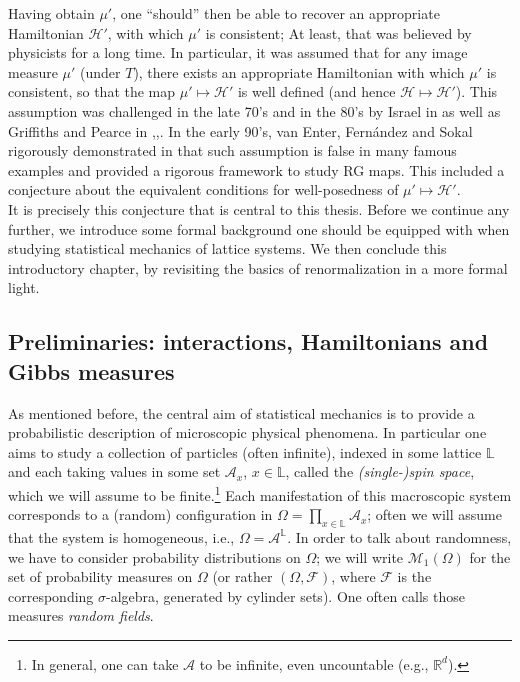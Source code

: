 \documentclass[12pt]{article}
\newcommand{\A}{\mathcal{A}}
\newcommand{\F}{\mathcal{F}}
\renewcommand{\H}{\mathcal{H}}
\renewcommand{\L}{\mathbb{L}}
\newcommand{\M}{\mathcal{M}}
\newcommand{\R}{\mathbb{R}}
\newcommand{\1}{\mathbbm{1}}
\newcommand{\5}{\vspace{0.5cm}}
\theoremstyle{definition}
\begin{document}
Having obtain $\mu'$, one ``should'' then be able to recover an appropriate Hamiltonian $\H'$, with which $\mu'$ is consistent; At least, that was believed by physicists for a long time. In particular, it was assumed that for any image measure $\mu'$ (under $T$), there exists an appropriate Hamiltonian with which $\mu'$ is consistent, so that the map $\mu'\mapsto\H'$ is well defined (and hence $\H\mapsto\H'$). This assumption was challenged in the late 70's and in the 80's by Israel in \cite{Isr} as well as Griffiths and Pearce in \cite{GP1},\cite{GP2},\cite{Grif}. In the early 90's, van Enter, Fern\'andez and Sokal rigorously demonstrated in \cite{EFS} that such assumption is false in many famous examples and provided a rigorous framework to study RG maps. This included a conjecture about the equivalent conditions for well-posedness of $\mu'\mapsto\H'$. \\

It is precisely this conjecture that is central to this thesis. Before we continue any further, we introduce some formal background one should be equipped with when studying statistical mechanics of lattice systems. We then conclude this introductory chapter, by revisiting the basics of renormalization in a more formal light.


\subsection{Preliminaries: interactions, Hamiltonians and Gibbs measures}

As mentioned before, the central aim of statistical mechanics is to provide a probabilistic description of microscopic physical phenomena. In particular one aims to study a collection of particles (often infinite), indexed in some lattice $\L$ and each taking values in some set $\A_x$, $x\in\L$, called the \textit{(single-)spin space}, which we will assume to be finite.\footnote{In general, one can take $\A$ to be infinite, even uncountable (e.g., $\R^d$).} Each manifestation of this macroscopic system corresponds to a (random) configuration in $\Omega=\prod_{x\in\L}\A_x$; often we will assume that the system is homogeneous, i.e., $\Omega=\A^{\L}$. In order to talk about randomness, we have to consider probability distributions on $\Omega$; we will write $\M_1(\Omega)$ for the set of probability measures on $\Omega$ (or rather $(\Omega,\F)$, where $\F$ is the  corresponding $\sigma$-algebra, generated by cylinder sets). One often calls those measures \textit{random fields}. \\
\end{document}

